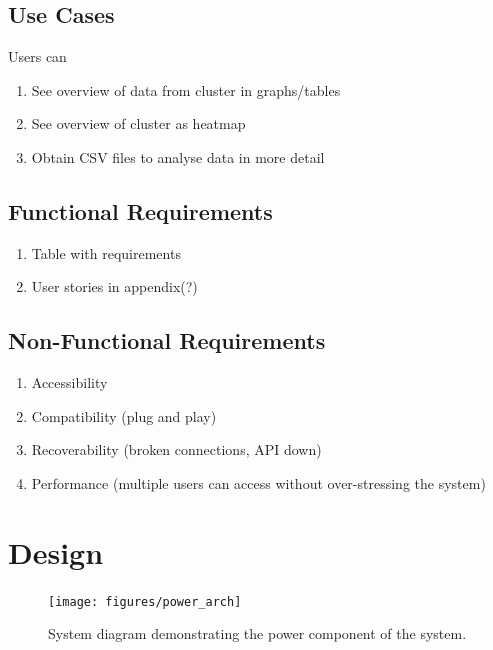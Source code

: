 \documentclass{l4proj}
\begin{document}
\section{Use Cases}
Users can
\begin{enumerate}
	\item See overview of data from cluster in graphs/tables
	\item See overview of cluster as heatmap
	\item Obtain CSV files to analyse data in more detail
\end{enumerate}
\section{Functional Requirements}
\begin{enumerate}
	\item Table with requirements
	\item User stories in appendix(?)
\end{enumerate}
\section{Non-Functional Requirements}
\begin{enumerate}
	\item Accessibility
	\item Compatibility (plug and play)
	\item Recoverability (broken connections, API down)
	\item Performance (multiple users can access without over-stressing the system)
\end{enumerate}

\chapter{Design}
\begin{figure}[!ht]
  \caption{System diagram demonstrating the power component of the system.}
  \centering
    \texttt{[image: figures/power\_arch]}
\end{figure}
\end{document}
